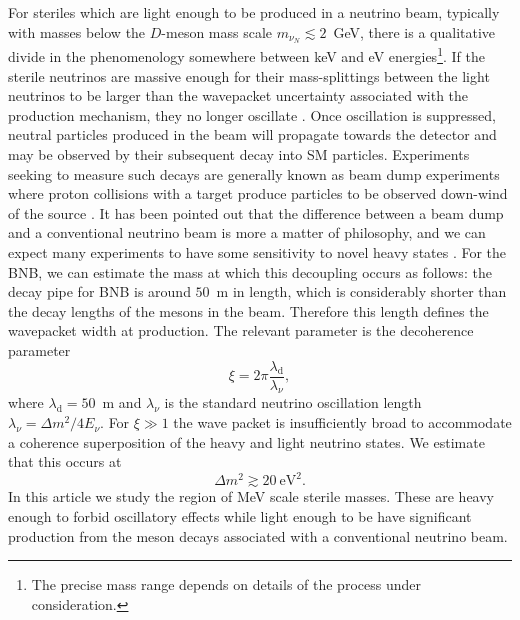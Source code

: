\documentclass[11pt, a4paper]{article}
\begin{document}
For steriles which are light enough to be produced in a neutrino beam,
typically with masses below the $D$-meson mass scale $m_{\nu_N} \lesssim
2$~GeV, there is a qualitative divide in the phenomenology somewhere between
keV and eV energies\footnote{The precise mass range depends on details of the
process under consideration.}. If the sterile neutrinos are massive enough for
their mass-splittings between the light neutrinos to be larger than the
wavepacket uncertainty associated with the production mechanism, they no longer
oscillate \cite{Akhmedov:2009rb}.  
%
Once oscillation is suppressed, neutral particles produced in the beam will
propagate towards the detector and may be observed by their subsequent decay
into SM particles. Experiments seeking to measure such decays are generally
known as beam dump experiments where proton collisions with a target produce
particles to be observed down-wind of the source \cite{CooperSarkar:1985nh,
Bergsma:1985is, Vaitaitis:1999wq, Bernardi:1985ny, Bernardi:1987ek,
Anelli:2015pba, Alekhin:2015byh}. It has been pointed out that the difference
between a beam dump and a conventional neutrino beam is more a matter of
philosophy, and we can expect many experiments to have some sensitivity to
novel heavy states \cite{Gorbunov:2007ak, Asaka:2012bb, Adams:2013qkq}. 
%
For the BNB, we can estimate the mass at which this decoupling occurs as
follows: the decay pipe for BNB is around $50$~m in length, which is
considerably shorter than the decay lengths of the mesons in the beam.
Therefore this length defines the wavepacket width at production.  The relevant
parameter is the decoherence parameter \cite{Akhmedov:2009rb, Hernandez:2011rs}
%
\[  \xi = 2\pi \frac{\lambda_\text{d}}{\lambda_\nu}, \]
%
where $\lambda_\text{d} = 50$~m and $\lambda_\nu$ is the standard neutrino
oscillation length $\lambda_\nu = \Delta m^2/4E_\nu$. For $\xi\gg1$ the wave
packet is insufficiently broad to accommodate a coherence superposition of the
heavy and light neutrino states. We estimate that this occurs at 
%
\[  \Delta m^2 \gtrsim 20~\text{eV}^2. \] 
%
In this article we study the region of MeV scale sterile masses. These are
heavy enough to forbid oscillatory effects while light enough to be have
significant production from the meson decays associated with a conventional
neutrino beam. 
\end{document}
